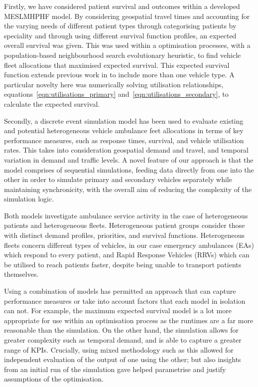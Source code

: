 \documentclass[preprint,12pt]{elsarticle}
\begin{document}
Firstly, we have considered patient survival and outcomes within a developed
MESLMHPHF model. By considering geospatial travel times and accounting for the
varying needs of different patient types through categorising patients by
speciality and through using different survival function profiles, an expected
overall survival was given. This was used within a optimisation
processes, with a population-based neighbourhood search
evolutionary heuristic, to find vehicle fleet allocations that maximised
expected survival. This expected survival function extends previous work in
\cite{Knight2012918} to include more than one vehicle type.
A particular novelty here was numerically solving utilisation relationships,
equations~\ref{eqn:utilisations_primary} and~\ref{eqn:utilisations_secondary},
to calculate the expected survival.

Secondly, a discrete event simulation model has been used to evaluate existing
and potential heterogeneous vehicle ambulance feet allocations in terms of key
performance measures, such as response times, survival, and vehicle
utilisation rates. This takes into consideration geospatial demand and travel,
and temporal variation in demand and traffic levels. A novel feature of our
approach is that the model comprises of sequential simulations, feeding data
directly from one into the other in order to simulate primary and secondary
vehicles separately while maintaining synchronicity, with the overall aim of
reducing the complexity of the simulation logic.

Both models investigate ambulance service activity in the case of
heterogeneous patients and heterogeneous fleets. Heterogeneous patient groups
consider those with distinct demand profiles, priorities, and survival
functions. Heterogeneous fleets concern different types of vehicles, in our
case emergency ambulances (EAs) which respond to every patient, and Rapid
Response Vehicles (RRVs) which can be utilised to reach patients faster,
despite being unable to transport patients themselves.

Using a combination of models has permitted an approach that can capture
performance measures or take into account factors that each model in isolation
can not. For example, the maximum expected survival model is a lot more
appropriate for use within an optimisation process as the runtimes are a far
more reasonable than the simulation. On the other hand, the simulation allows
for greater complexity such as temporal demand, and is able to capture a
greater range of KPIs. Crucially, using mixed methodology such as this allowed
for independent evaluation of the output of one using the other; but also
insights from an initial run of the simulation gave helped parametrise and
justify assumptions of the optimisation.
\end{document}
